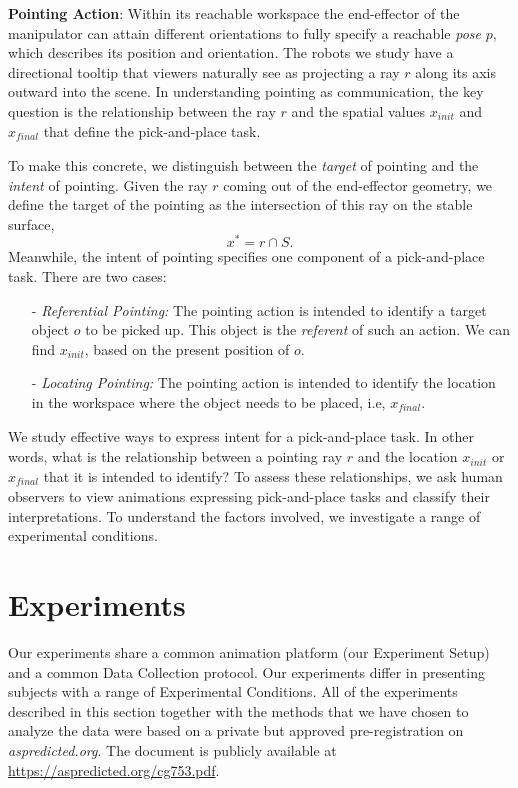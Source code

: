 \documentclass[letterpaper]{article} %
\newcommand{\xinit}{\ensuremath{x_{\textit{init}}}}
\newcommand{\xfinal}{\ensuremath{x_{\textit{final}}}}
\begin{document}
\noindent\textbf{Pointing Action}: Within its reachable workspace the end-effector of the manipulator can attain different orientations to fully specify a reachable \textit{pose} $p$, which describes its position and orientation.  The robots we study have a directional tooltip that viewers naturally see as projecting a ray $r$ along its axis outward into the scene.  In understanding pointing as communication, the key question is the relationship between the ray $r$ and the spatial values $\xinit$ and $\xfinal$ that define the pick-and-place task.


To make this concrete, we distinguish between the \emph{target} of pointing and the \emph{intent} of pointing. Given the ray $r$ coming out of the end-effector geometry, we define the target of the pointing as the intersection of this ray on the stable surface, $$x^*= r\cap S.$$ Meanwhile, the intent of pointing specifies one component of a pick-and-place task.  There are two cases:
\begin{itemize}
    \item [-] \textit{Referential Pointing:} The pointing action is intended to identify a target object $o$ to be picked up. This object is the \textit{referent} of such an action. We can find $\xinit$, based on the present position of $o$.
    \item [-] \textit{Locating Pointing:} The pointing action is intended to identify the location in the workspace where the object needs to be placed, i.e, $\xfinal$.
\end{itemize}


We study effective ways to express intent for a pick-and-place task. In other words, what is the relationship between a pointing ray $r$ and the location $\xinit$ or $\xfinal$ that it is intended to identify?  To assess these relationships, we ask human observers to view animations expressing pick-and-place tasks and classify their interpretations.  To understand the factors involved, we investigate a range of experimental conditions.



\section{Experiments}
\label{experiments}


Our experiments share a common animation platform (our Experiment Setup) and a common Data Collection protocol.  Our experiments differ in presenting subjects with a range of Experimental Conditions.  All of the experiments described in this section together with the methods that we have chosen to analyze the data were based on a private but approved pre-registration on \textit{aspredicted.org}. The document is publicly available at \url{https://aspredicted.org/cg753.pdf}.
\end{document}
